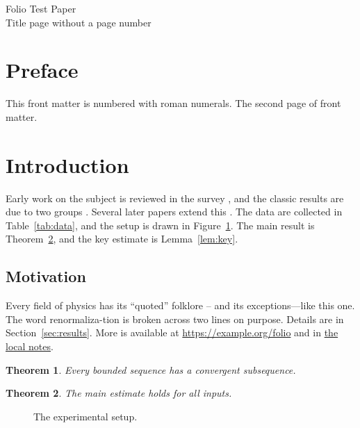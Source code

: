 \documentclass[11pt]{article}
\numberwithin{equation}{section}
\newtheorem{theorem}{Theorem}[section]
\begin{document}
\begin{center}
  {\LARGE Folio Test Paper}\\[1em]
  Title page without a page number
\end{center}
\clearpage

\section*{Preface}
This front matter is numbered with roman numerals.
\clearpage
\noindent The second page of front matter.
\clearpage

\section{Introduction}
\label{sec:intro}
Early work on the subject is reviewed in the survey \cite{alpha}, and the classic
results are due to two groups \cite{beta,gamma}. Several later papers extend this \cite{delta,epsilon,zeta}.
The data are collected in Table~\ref{tab:data}, and the setup is drawn in Figure~\ref{fig:setup}.
The main result is Theorem~\ref{thm:main}, and the key estimate is Lemma~\ref{lem:key}.

\subsection{Motivation}
Every field of physics has its ``quoted'' folklore -- and its exceptions---like this one.
The word renormaliza-\newline tion is broken across two lines on purpose.
Details are in Section~\ref{sec:results}. More is available at
\url{https://example.org/folio} and in \href{file:notes.txt}{the local notes}.

\begin{theorem}
\label{thm:first}
Every bounded sequence has a convergent subsequence.
\end{theorem}

\begin{theorem}
\label{thm:main}
The main estimate holds for all inputs.
\end{theorem}

\begin{figure}[h]
  \centering
  \fbox{\rule{0pt}{2cm}\hspace{4cm}}
  \caption{The experimental setup.}
  \label{fig:setup}
\end{figure}
\clearpage
\end{document}
